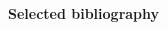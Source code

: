       
  \begin{block}{\bf Selected bibliography}

    \begin{thebibliography}{10}
      \newcommand{\tinysep}{\vspace*{-.1em}}

      \renewcommand{\baselinestretch}{.98}
      
      \tinysep

%
%
%
%
%
%      
      
    \end{thebibliography}
    
  \end{block}

